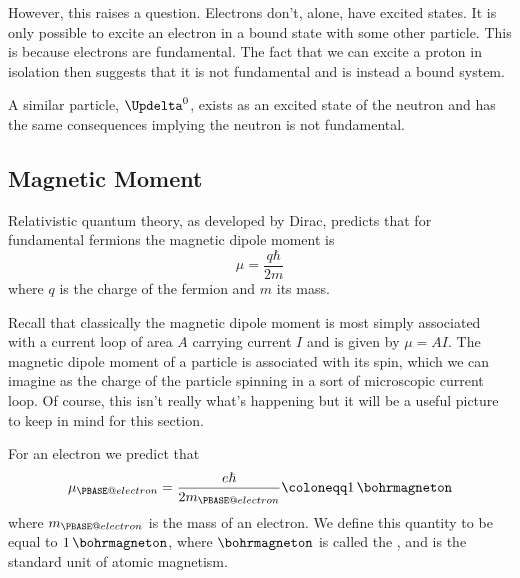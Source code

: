 \documentclass[fleqn]{NotesClass}
\makeatletter
\newcommand{\PBASE@Delta}{\Updelta}
\newcommand{\PDeltazero}{\ensuremath{\PBASE@Delta^0}}
\newcommand{\Pee}{\PBASE@electron}
\makeatother
\begin{document}
    However, this raises a question.
    Electrons don't, alone, have excited states.
    It is only possible to excite an electron in a bound state with some other particle.
    This is because electrons are fundamental.
    The fact that we can excite a proton in isolation then suggests that it is not fundamental and is instead a bound system.
    
    A similar particle, \PDeltazero, exists as an excited state of the neutron and has the same consequences implying the neutron is not fundamental.
    
    \subsection{Magnetic Moment}
    Relativistic quantum theory, as developed by Dirac, predicts that for fundamental fermions the magnetic dipole moment is
    \begin{equation}
        \mu = \frac{q\hbar}{2m}
    \end{equation}
    where \(q\) is the charge of the fermion and \(m\) its mass.
    
    Recall that classically the magnetic dipole moment is most simply associated with a current loop of area \(A\) carrying current \(I\) and is given by \(\mu = AI\).
    The magnetic dipole moment of a particle is associated with its spin, which we can imagine as the charge of the particle spinning in a sort of microscopic current loop.
    Of course, this isn't really what's happening but it will be a useful picture to keep in mind for this section.
    
    For an electron we predict that
    \begin{equation}
        \mu_{\Pee} = \frac{e\hbar}{2m_{\Pee}} \coloneqq \qty{1}{\bohrmagneton}
    \end{equation}
    where \(m_{\Pee}\) is the mass of an electron.
    We define this quantity to be equal to \(\qty{1}{\bohrmagneton}\), where \(\unit{\bohrmagneton}\) is called the , and is the standard unit of atomic magnetism.
    
\end{document}
